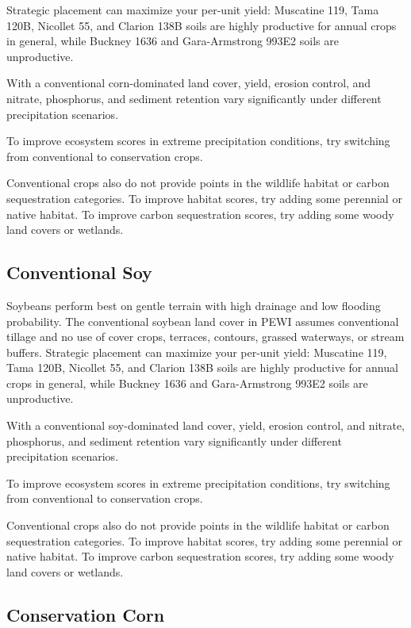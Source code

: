 \documentclass[11pt]{article}
\begin{document}
Strategic placement can maximize your per-unit yield: Muscatine 119, Tama 120B, Nicollet 55, and Clarion 138B soils are highly productive for annual crops in general, while Buckney 1636 and Gara-Armstrong 993E2 soils are unproductive.

With a conventional corn-dominated land cover, yield, erosion control, and nitrate, phosphorus, and sediment retention vary significantly under different precipitation scenarios.

To improve ecosystem scores in extreme precipitation conditions, try switching from conventional to conservation crops.

Conventional crops also do not provide points in the wildlife habitat or carbon sequestration categories. To improve habitat scores, try adding some perennial or native habitat. To improve carbon sequestration scores, try adding some woody land covers or wetlands.


\subsection{Conventional Soy}

Soybeans perform best on gentle terrain with high drainage and low flooding probability. The conventional soybean land cover in PEWI assumes conventional tillage and no use of cover crops, terraces, contours, grassed waterways, or stream buffers.
Strategic placement can maximize your per-unit yield: Muscatine 119, Tama 120B, Nicollet 55, and Clarion 138B soils are highly productive for annual crops in general, while Buckney 1636 and Gara-Armstrong 993E2 soils are unproductive.

With a conventional soy-dominated land cover, yield, erosion control, and nitrate, phosphorus, and sediment retention vary significantly under different precipitation scenarios.

To improve ecosystem scores in extreme precipitation conditions, try switching from conventional to conservation crops.

Conventional crops also do not provide points in the wildlife habitat or carbon sequestration categories. To improve habitat scores, try adding some perennial or native habitat. To improve carbon sequestration scores, try adding some woody land covers or wetlands.

\subsection{Conservation Corn}
\end{document}
